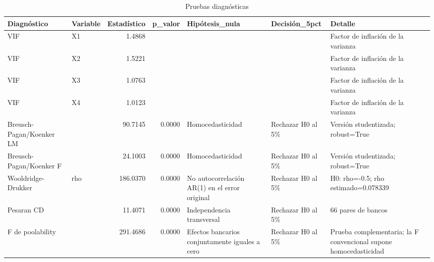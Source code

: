 \begin{table}
\caption{Pruebas diagnósticas}
\label{tab:diagnosticos}
\begin{tabular}{llrrlll}
\toprule
Diagnóstico & Variable & Estadístico & p\_valor & Hipótesis\_nula & Decisión\_5pct & Detalle \\
\midrule
VIF & X1 & 1.4868 &  &  &  & Factor de inflación de la varianza \\
VIF & X2 & 1.5221 &  &  &  & Factor de inflación de la varianza \\
VIF & X3 & 1.0763 &  &  &  & Factor de inflación de la varianza \\
VIF & X4 & 1.0123 &  &  &  & Factor de inflación de la varianza \\
Breusch-Pagan/Koenker LM &  & 90.7145 & 0.0000 & Homocedasticidad & Rechazar H0 al 5\% & Versión studentizada; robust=True \\
Breusch-Pagan/Koenker F &  & 24.1003 & 0.0000 & Homocedasticidad & Rechazar H0 al 5\% & Versión studentizada; robust=True \\
Wooldridge-Drukker & rho & 186.0370 & 0.0000 & No autocorrelación AR(1) en el error original & Rechazar H0 al 5\% & H0: rho=-0.5; rho estimado=0.078339 \\
Pesaran CD &  & 11.4071 & 0.0000 & Independencia transversal & Rechazar H0 al 5\% & 66 pares de bancos \\
F de poolability &  & 291.4686 & 0.0000 & Efectos bancarios conjuntamente iguales a cero & Rechazar H0 al 5\% & Prueba complementaria; la F convencional supone homocedasticidad \\
\bottomrule
\end{tabular}
\end{table}
